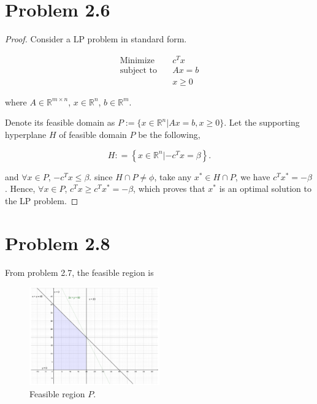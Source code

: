 \documentclass[12pt]{article}
\begin{document}
\section*{Problem 2.6}

\begin{proof}

Consider a LP problem in standard form. 

\begin{equation*}
\begin{aligned}
\text{Minimize} \quad & c^Tx \\
\text{subject\  to} \quad & Ax = b \\
 & x \geqslant 0
\end{aligned}
\end{equation*}

where $A \in \mathbb{R}^{m\times n}$, $x\in \mathbb{R}^n$, $b \in \mathbb{R}^m$.

Denote its feasible domain as $P := \{x \in \mathbb{R}^n | Ax = b, x \geqslant 0 \}$. Let the supporting hyperplane $H$ of feasible domain $P$ be the following,

$$
H: = \left\{  x\in\mathbb{R}^n| -c^Tx = \beta \right\}.
$$

and $\forall x\in P$, $-c^Tx \leqslant \beta$. since $H\cap P \neq \phi$, take any $x^* \in H\cap P$, we have $c^Tx^* =  -\beta$. Hence, $\forall x\in P$, $c^Tx \geqslant c^Tx^* = -\beta$, which proves that $x^*$ is an optimal solution to the LP problem.

\end{proof}

\section*{Problem 2.8}
From problem 2.7, the feasible region is 

\begin{figure}[htbp]
  \caption{Feasible region $P$.}
  \centering
    \includegraphics[width=0.5\textwidth]{2_8P.pdf}
\end{figure}
\end{document}
